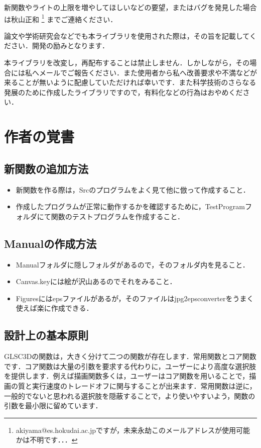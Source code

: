 \documentclass[platex,a4paper,12pt]{jsarticle}%
\begin{document}
新関数やライトの上限を増やしてほしいなどの要望，またはバグを発見した場合は秋山正和
\footnote{akiyama@es.hokudai.ac.jpですが，未来永劫このメールアドレスが使用可能かは不明です．．．}
までご連絡ください．

論文や学術研究会などでも本ライブラリを使用された際は，その旨を記載してください．開発の励みとなります．

本ライブラリを改変し，再配布することは禁止しません．しかしながら，その場合には私へメールでご報告ください．また使用者から私へ改善要求や不満などが来ることが無いように配慮していただければ幸いです．また科学技術のさらなる発展のために作成したライブラリですので，有料化などの行為はおやめください．

\newpage
\section{作者の覚書}

\subsection{新関数の追加方法}
\begin{itemize}
 \item 新関数を作る際は，Srcのプログラムをよく見て他に倣って作成すること．
 \item 作成したプログラムが正常に動作するかを確認するために，TestProgramフォルダにて関数のテストプログラムを作成すること．
\end{itemize}

\subsection{Manualの作成方法}
\begin{itemize}
 \item Manualフォルダに隠しフォルダがあるので，そのフォルダ内を見ること．
 \item Canvas.keyには絵が沢山あるのでそれをみること．
 \item Figuresにはepsファイルがあるが，そのファイルはjpg2epsconverterをうまく使えば楽に作成できる．
\end{itemize}

\subsection{設計上の基本原則}
GLSC3Dの関数は，大きく分けて二つの関数が存在します．常用関数とコア関数です．コア関数は大量の引数を要求する代わりに，ユーザーにより高度な選択肢を提供します．例えば描画関数多くは，ユーザーはコア関数を用いることで，描画の質と実行速度のトレードオフに関与することが出来ます．常用関数は逆に，一般的でないと思われる選択肢を隠蔽することで，より使いやすいよう，関数の引数を最小限に留めています．
\end{document}
